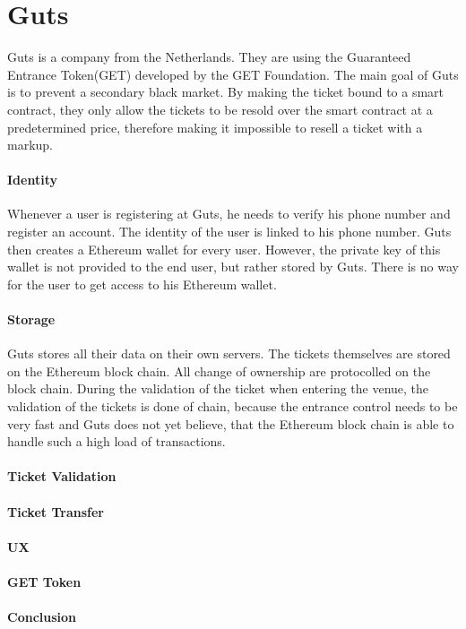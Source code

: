 
\section{Guts}
Guts is a company from the Netherlands. They are using the Guaranteed Entrance Token(GET) developed by the GET Foundation. The main goal of Guts is to prevent a secondary black market. By making the ticket bound to a smart contract, they only allow the tickets to be resold over the smart contract at a predetermined price, therefore making it impossible to resell a ticket with a markup.

\paragraph{Identity}
Whenever a user is registering at Guts, he needs to verify his phone number and register an account. The identity of the user is linked to his phone number. Guts then creates a Ethereum wallet for every user. However, the private key of this wallet is not provided to the end user, but rather stored by Guts. There is no way for the user to get access to his Ethereum wallet. 


\paragraph{Storage}
Guts stores all their data on their own servers. The tickets themselves are stored on the Ethereum block chain. All change of ownership are protocolled on the block chain. During the validation of the ticket when entering the venue, the validation of the tickets is done of chain, because the entrance control needs to be very fast and Guts does not yet believe, that the Ethereum block chain is able to handle such a high load of transactions.

\paragraph{Ticket Validation}


\paragraph{Ticket Transfer}


\paragraph{UX}


\paragraph{GET Token}

\paragraph{Conclusion}